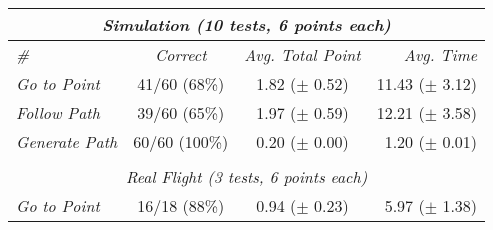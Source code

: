 \begin{table}
  \centering
  \begin{tabular}{lccr}
    \multicolumn{4}{c}{\textit{Simulation (10 tests, 6 points each)}}                         \\ \hline
    \textit{\#} & \textit{Correct} & \textit{Avg. Total Point} & \textit{Avg. Time} \\ \bottomrule
    \textit{Go to Point} & 41/60 (68\%) & 1.82 ($\pm$ 0.52) & 11.43 ($\pm$ 3.12) \\ \bottomrule
    \textit{Follow Path} & 39/60 (65\%) & 1.97 ($\pm$ 0.59) & 12.21 ($\pm$ 3.58) \\ \bottomrule
    \textit{Generate Path} & 60/60 (100\%) & 0.20 ($\pm$ 0.00) & 1.20 ($\pm$ 0.01) \\ \bottomrule
    \hline
    \multicolumn{4}{c}{\textit{ }}                                  \\
    \multicolumn{4}{c}{\textit{Real Flight (3 tests, 6 points each)}}                        \\ \hline
    \textit{Go to Point} & 16/18 (88\%) & 0.94 ($\pm$ 0.23) & 5.97 ($\pm$ 1.38) \\ \bottomrule
  \end{tabular}
\end{table}

